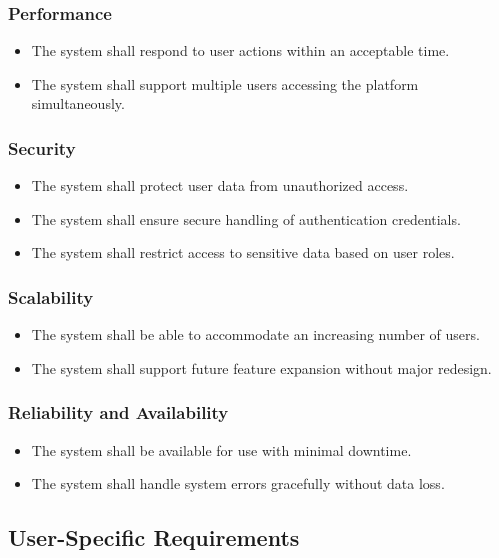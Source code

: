 \documentclass[12pt,a4paper]{article}
\begin{document}
\subsubsection{Performance}
\begin{itemize}
    \item The system shall respond to user actions within an acceptable time.
    \item The system shall support multiple users accessing the platform simultaneously.
\end{itemize}

\subsubsection{Security}
\begin{itemize}
    \item The system shall protect user data from unauthorized access.
    \item The system shall ensure secure handling of authentication credentials.
    \item The system shall restrict access to sensitive data based on user roles.
\end{itemize}

\subsubsection{Scalability}
\begin{itemize}
    \item The system shall be able to accommodate an increasing number of users.
    \item The system shall support future feature expansion without major redesign.
\end{itemize}

\subsubsection{Reliability and Availability}
\begin{itemize}
    \item The system shall be available for use with minimal downtime.
    \item The system shall handle system errors gracefully without data loss.
\end{itemize}

\subsection{User-Specific Requirements}
\end{document}

